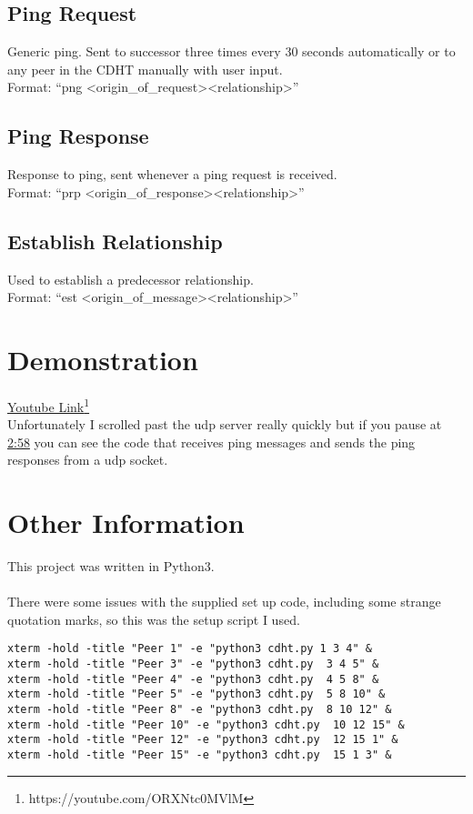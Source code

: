 \documentclass[a4paper]{article}
\begin{document}
\subsection{Ping Request}
Generic ping. Sent to successor three times every 30 seconds automatically or to any peer in the CDHT manually with user input.\\
Format: ``png \textless origin\_of\_request\textgreater  \textless relationship\textgreater ''

\subsection{Ping Response}
Response to ping, sent whenever a ping request is received.\\
Format: ``prp \textless origin\_of\_response\textgreater  \textless relationship\textgreater ''

\subsection{Establish Relationship}
Used to establish a predecessor relationship.\\
Format: ``est \textless origin\_of\_message\textgreater  \textless relationship\textgreater ''

\section{Demonstration}
\href{https://youtube.com/ORXNtc0MVlM}{Youtube Link}\footnote{https://youtube.com/ORXNtc0MVlM} \\

Unfortunately I scrolled past the udp server really quickly but if you pause at \href{https://youtube.com/ORXNtc0MVlM?t=2m58s}{2:58} you can see the code that receives ping messages and sends the ping responses from a udp socket.

\section{Other Information}
This project was written in Python3. \\ \\

There were some issues with the supplied set up code, including some strange quotation marks, so this was the setup script I used. 
\begin{verbatim}
xterm -hold -title "Peer 1" -e "python3 cdht.py 1 3 4" &
xterm -hold -title "Peer 3" -e "python3 cdht.py  3 4 5" &
xterm -hold -title "Peer 4" -e "python3 cdht.py  4 5 8" &
xterm -hold -title "Peer 5" -e "python3 cdht.py  5 8 10" &
xterm -hold -title "Peer 8" -e "python3 cdht.py  8 10 12" &
xterm -hold -title "Peer 10" -e "python3 cdht.py  10 12 15" &
xterm -hold -title "Peer 12" -e "python3 cdht.py  12 15 1" &
xterm -hold -title "Peer 15" -e "python3 cdht.py  15 1 3" &
\end{verbatim}
\end{document}
